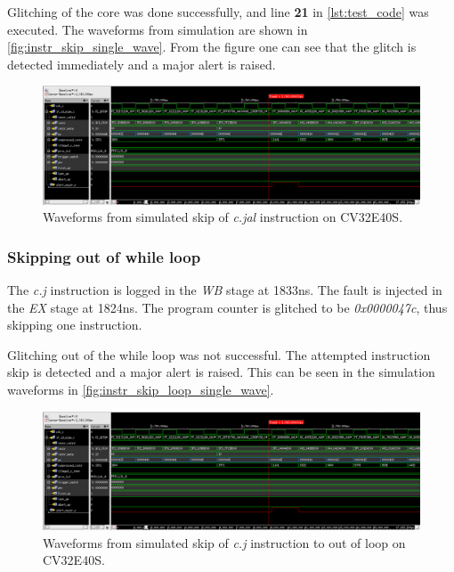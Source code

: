 Glitching of the core was done successfully, and line \textbf{21} in \autoref{lst:test_code} was executed. The waveforms from simulation are shown in \autoref{fig:instr_skip_single_wave}. From the figure one can see that the glitch is detected immediately and a major alert is raised. 

\begin{figure}[h!]
    \centering
    \includegraphics[width=\textwidth]{docs/images/instr_skip_glitch_injection_single_core.png}
    \caption{Waveforms from simulated skip of \textit{c.jal} instruction on CV32E40S.}
    \label{fig:instr_skip_single_wave}
\end{figure}

\subsubsection{Skipping out of while loop}

The \textit{c.j} instruction is logged in the \textit{WB} stage at 1833ns. The fault is injected in the \textit{EX} stage at 1824ns. The program counter is glitched to be \textit{0x0000047c}, thus skipping one instruction.

Glitching out of the while loop was not successful. The attempted instruction skip is detected and a major alert is raised. This can be seen in the simulation waveforms in \autoref{fig:instr_skip_loop_single_wave}. 

\begin{figure}[h!]
    \centering
    \includegraphics[width=\textwidth]{docs/images/instr_skip_glitch_injection_single_core.png}
    \caption{Waveforms from simulated skip of \textit{c.j} instruction to out of loop on CV32E40S.}
    \label{fig:instr_skip_loop_single_wave}
\end{figure}

